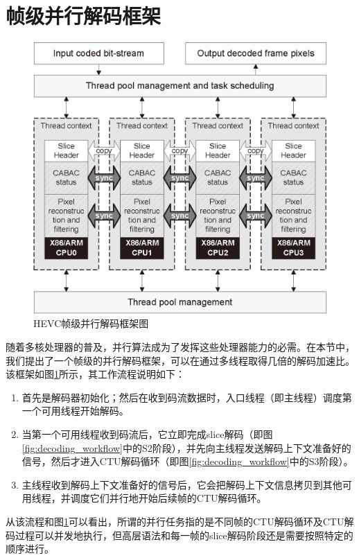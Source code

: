 \section{帧级并行解码框架}

\begin{figure}[ht]
	\centering
	\includegraphics[width = 0.8\linewidth]{eps/parallel_decoding_framework}
	\caption{\label{fig:parallel_decoding_framework}HEVC帧级并行解码框架图}
\end{figure}

随着多核处理器的普及，并行算法成为了发挥这些处理器能力的必需。在本节中，我们提出了一个帧级的并行解码框架，可以在通过多线程取得几倍的解码加速比。该框架如图\ref{fig:parallel_decoding_framework}所示，其工作流程说明如下：
\begin{enumerate}
	\item 首先是解码器初始化；然后在收到码流数据时，入口线程（即主线程）调度第一个可用线程开始解码。
	\item 当第一个可用线程收到码流后，它立即完成slice解码（即图\ref{fig:decoding_workflow}中的S2阶段），并先向主线程发送解码上下文准备好的信号，然后才进入CTU解码循环（即图\ref{fig:decoding_workflow}中的S3阶段）。
	\item 主线程收到解码上下文准备好的信号后，它会把解码上下文信息拷贝到其他可用线程，并调度它们并行地开始后续帧的CTU解码循环。
\end{enumerate}

从该流程和图\ref{fig:parallel_decoding_framework}可以看出，所谓的并行任务指的是不同帧的CTU解码循环及CTU解码过程可以并发地执行，但高层语法和每一帧的slice解码阶段还是需要按照特定的顺序进行。


